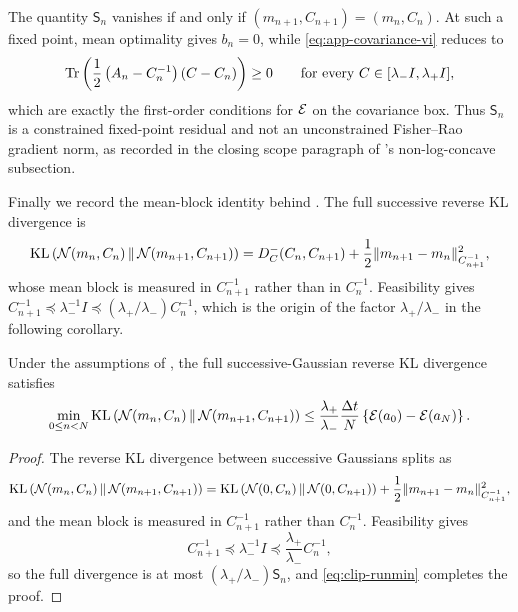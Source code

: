 The quantity $\mathsf{S}_n$ vanishes if and only if $(m_{n+1}, C_{n+1}) = (m_n, C_n)$. At such a fixed point, mean optimality gives $b_n = 0$, while \eqref{eq:app-covariance-vi} reduces to
\begin{equation*}
    \operatorname{Tr} \left( \frac{1}{2} \left( A_n - C_n^{-1} \right) (C - C_n) \right) \geq 0 \qquad \text{for every } C \in [\lambda_- I, \lambda_+ I],
\end{equation*}
which are exactly the first-order conditions for $\mathcal{E}$ on the covariance box. Thus $\mathsf{S}_n$ is a constrained fixed-point residual and not an unconstrained Fisher--Rao gradient norm, as recorded in the closing scope paragraph of 's non-log-concave subsection.

Finally we record the mean-block identity behind . The full successive reverse KL divergence is
\begin{equation*}
    \mathrm{KL} \left( \mathcal{N} (m_n, C_n) \, \middle\| \, \mathcal{N} (m_{n+1}, C_{n+1}) \right) = D_C^- (C_n, C_{n+1}) + \frac{1}{2} \| m_{n+1} - m_n \|_{C_{n+1}^{-1}}^2,
\end{equation*}
whose mean block is measured in $C_{n+1}^{-1}$ rather than in $C_n^{-1}$. Feasibility gives $C_{n+1}^{-1} \preceq \lambda_-^{-1} I \preceq (\lambda_+ / \lambda_-) C_n^{-1}$, which is the origin of the factor $\lambda_+ / \lambda_-$ in the following corollary.

\begin{corollary}\label{cor:clip-KL-full}
    Under the assumptions of , the full successive-Gaussian reverse KL divergence satisfies
    \begin{equation*}
        \min_{0 \leq n < N} \mathrm{KL} \left( \mathcal{N} (m_n, C_n) \, \middle\| \, \mathcal{N} (m_{n+1}, C_{n+1}) \right) \leq \frac{\lambda_+}{\lambda_-} \frac{\Delta t}{N} \left\{ \mathcal{E} (a_0) - \mathcal{E} (a_N) \right\}.
    \end{equation*}
\end{corollary}

\begin{proof}
    The reverse KL divergence between successive Gaussians splits as
    \begin{equation*}
        \mathrm{KL} \left( \mathcal{N} (m_n, C_n) \, \middle\| \, \mathcal{N} (m_{n+1}, C_{n+1}) \right) = \mathrm{KL} \left( \mathcal{N} (0, C_n) \, \middle\| \, \mathcal{N} (0, C_{n+1}) \right) + \frac{1}{2} \| m_{n+1} - m_n \|_{C_{n+1}^{-1}}^2,
    \end{equation*}
    and the mean block is measured in $C_{n+1}^{-1}$ rather than $C_n^{-1}$. Feasibility gives
    \begin{equation*}
        C_{n+1}^{-1} \preceq \lambda_-^{-1} I \preceq \frac{\lambda_+}{\lambda_-} C_n^{-1},
    \end{equation*}
    so the full divergence is at most $(\lambda_+ / \lambda_-) \mathsf{S}_n$, and \eqref{eq:clip-runmin} completes the proof.
\end{proof}

